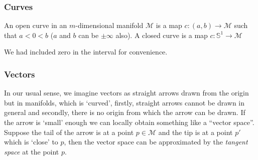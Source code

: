 \subsubsection{Curves}
\begin{definition}[Curve]
  An open curve in an $m$-dimensional manifold $\mathcal{M}$ is a map $c:(a,b)\rightarrow \mathcal{M}$ such that $a<0<b$ ($a$ and $b$ can be $\pm \infty$ also). A closed curve is a map $c:\mathbb{S}^1\rightarrow \mathcal{M}$

\end{definition}
We had included zero in the interval for convenience. 
\subsubsection{Vectors}
In our usual sense, we imagine vectors as straight arrows drawn from the origin but in manifolds, which is `curved', firstly, straight arrows cannot be drawn in general and secondly, there is no origin from which the arrow can be drawn. If the arrow is `small' enough we can locally obtain something like a ``vector space''. Suppose the tail of the arrow is at a point $p\in \mathcal{M}$ and the tip is at a point $p'$ which is `close' to $p$, then the vector space can be approximated by the \textit{tangent space} at the point $p$. 

